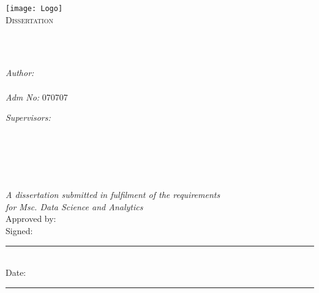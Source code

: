 \documentclass[
  11pt,
  oneside,
  english,
  singlespacing,
  headsepline,
]{MastersDoctoralThesis}
\author{\href{https://bonfacemunyoki.com}{Bonface Munyoki Kilyungi}}
\begin{document}
\frontmatter

\pagestyle{plain}

\begin{titlepage}
\begin{center}

\vspace*{.06\textheight}
\texttt{[image: Logo]}\\ %
\textsc{\Large Dissertation}\\[0.5cm] %

\HRule \\[0.4cm] %
{\huge \bfseries \ttitle\par}\vspace{0.4cm} %
\HRule \\[1.5cm] %

\begin{minipage}[t]{0.4\textwidth}
\begin{flushleft} \large
\emph{Author:}\\
\href{https://bonfacemunyoki.com}{\authorname} \\
\emph{Adm No:} 070707
\end{flushleft}
\end{minipage}
\begin{minipage}[t]{0.4\textwidth}
  \begin{flushright} \large
    \emph{Supervisors:} \\
    \supnamei\\
    \supnameii\\
    \supnameiii\\
    \supnameiv
\end{flushright}
\end{minipage}\\

\vfill

\large \textit{A dissertation submitted in fulfilment of the
  requirements\\ for Msc. Data Science and Analytics}\\[1cm]

\noindent Approved by: \supnamei\\[1cm]
\noindent Signed:
\rule[0pt]{25em}{0.5pt}\\[1cm] %

\noindent Date:
\rule[0pt]{25em}{0.5pt} %


\end{center}

\end{titlepage}
\end{document}
